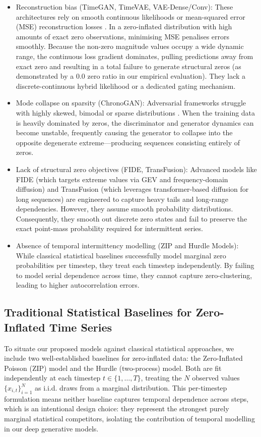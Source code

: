 \documentclass[make,article,submit,moreauthors]{Definitions/mdpi}
\begin{document}
\begin{itemize}
    \item Reconstruction bias (TimeGAN, TimeVAE, VAE-Dense/Conv): These architectures rely on smooth continuous likelihoods or mean-squared error (MSE) reconstruction losses \cite{ref2, ref23}. In a zero-inflated distribution with high amounts of exact zero observations, minimising MSE penalises errors smoothly. Because the non-zero magnitude values occupy a wide dynamic range, the continuous loss gradient dominates, pulling predictions away from exact zero and resulting in a total failure to generate structural zeros (as demonstrated by a 0.0 zero ratio in our empirical evaluation). They lack a discrete-continuous hybrid likelihood or a dedicated gating mechanism.
    \item Mode collapse on sparsity (ChronoGAN): Adversarial frameworks struggle with highly skewed, bimodal or sparse distributions \cite{ref4}. When the training data is heavily dominated by zeros, the discriminator and generator dynamics can become unstable, frequently causing the generator to collapse into the opposite degenerate extreme—producing sequences consisting entirely of zeros.
    \item Lack of structural zero objectives (FIDE, TransFusion): Advanced models like FIDE \cite{ref28} (which targets extreme values via GEV and frequency-domain diffusion) and TransFusion \cite{ref29} (which leverages transformer-based diffusion for long sequences) are engineered to capture heavy tails and long-range dependencies. However, they assume smooth probability distributions. Consequently, they smooth out discrete zero states and fail to preserve the exact point-mass probability required for intermittent series.
    \item Absence of temporal intermittency modelling (ZIP and Hurdle Models): While classical statistical baselines \cite{ref9} successfully model marginal zero probabilities per timestep, they treat each timestep independently. By failing to model serial dependence across time, they cannot capture zero-clustering, leading to higher autocorrelation errors.
\end{itemize}



\subsection{Traditional Statistical Baselines for Zero-Inflated Time Series}
To situate our proposed models against classical statistical approaches, we include two well-established baselines for zero-inflated data: the Zero-Inflated Poisson (ZIP) model and the Hurdle (two-process) model. Both are fit independently at each timestep $t \in \{1, \ldots, T\}$, treating the $N$ observed values $\{x_{i,t}\}_{i=1}^{N}$ as i.i.d. draws from a marginal distribution. This per-timestep formulation means neither baseline captures temporal dependence across steps, which is an intentional design choice: they represent the strongest purely marginal statistical competitors, isolating the contribution of temporal modelling in our deep generative models. 
\end{document}
